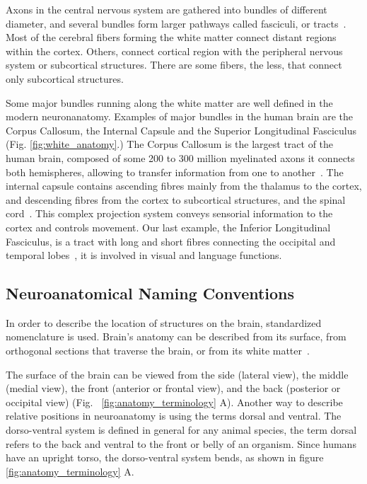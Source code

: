 Axons in the central nervous system are gathered into bundles of different
diameter, and several bundles form larger pathways called fasciculi, or tracts~\cite{Catani2012}.
Most of the cerebral fibers forming the white matter connect distant regions 
within the cortex. Others, connect cortical region with the peripheral nervous
system or subcortical structures. There are some fibers, the less, that connect
only subcortical structures.

Some major bundles running along the white matter are well defined in the
modern neuronanatomy. Examples of major bundles in the human brain are the
Corpus Callosum, the Internal Capsule and the Superior Longitudinal Fasciculus
(Fig. \ref{fig:white_anatomy}.)
The Corpus Callosum is the largest tract of the human brain, composed of some
200 to 300 million myelinated axons it connects both hemispheres, allowing to
transfer information from one to another~\cite{Catani2012}. The internal capsule
contains ascending fibres mainly from the thalamus to the cortex, and descending
fibres from the cortex to subcortical structures, and the spinal cord~\cite{Catani2012}.
This complex projection system conveys sensorial information to the cortex and 
controls movement. Our last example, the Inferior Longitudinal Fasciculus, is
a tract with long and short fibres connecting the occipital and temporal lobes~\cite{Catani2012},
it is involved in visual and language functions.

\subsection{Neuroanatomical Naming Conventions}

In order to describe the location of structures on the brain, standardized
nomenclature is used. Brain's anatomy can be described from its surface,
from orthogonal sections that traverse the brain, or from its white matter~\cite{Catani2012}.

The surface of the brain can be viewed from the side (lateral view),
the middle (medial view), the front (anterior or frontal view), and the back
(posterior or occipital view) (Fig. ~\ref{fig:anatomy_terminology} A). Another
way to describe relative positions in neuroanatomy is using the terms dorsal and
ventral.
The dorso-ventral system is defined in general for any animal species, the term
dorsal refers to the back and ventral to the front or belly of an organism. Since
humans have an upright torso, the dorso-ventral system bends, as shown in figure
\ref{fig:anatomy_terminology} A.

